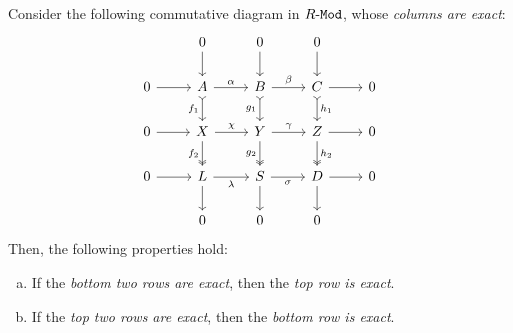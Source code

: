 \begin{proposition}
\label{prop:3-by-3-lemma}
Consider the following commutative diagram in \({R\text{-}\texttt{Mod}}\), whose \emph{columns
  are exact}:
\[
\begin{tikzcd}
&0 \ar[d] &0 \ar[d] &0 \ar[d] &
\\
0 \ar[r]
&A \ar[r, "\alpha"] \ar[d, tail, "f_1"']
&B \ar[r, "\beta"] \ar[d, tail, "g_1"']
&C \ar[r] \ar[d, tail, "h_1"]
&0
\\
0 \ar[r]
&X \ar[r, "\chi"] \ar[d, two heads, "f_2"']
&Y \ar[r, "\gamma"] \ar[d, two heads, "g_2"']
&Z \ar[r] \ar[d, two heads, "h_2"]
&0
\\
0 \ar[r]
&L \ar[r, "\lambda"'] \ar[d]
&S \ar[r, "\sigma"'] \ar[d]
&D \ar[r] \ar[d]
&0
\\
&0 &0 &0 &
\end{tikzcd}
\]
Then, the following properties hold:
\begin{enumerate}[(a)]\setlength\itemsep{0em}
\item If the \emph{bottom two rows are exact}, then the \emph{top row is exact}.
\item If the \emph{top two rows are exact}, then the \emph{bottom row is exact}.
\end{enumerate}
\end{proposition}

